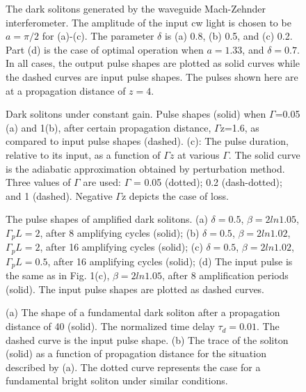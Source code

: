 \begin{figure}
\caption{The dark solitons generated by the waveguide
Mach-Zehnder interferometer.  The amplitude of the input cw
light is chosen to be $ a =  \pi /2 $ for (a)-(c).  The
parameter $ \delta $ is (a) 0.8, (b) 0.5, and (c) 0.2.  Part (d) is the case
of optimal operation when $ a =  1.33 $, and $ \delta  =  0.7 $.  In all
cases, the output pulse shapes are plotted as solid curves while
the dashed curves are input pulse shapes.  The pulses shown here are at a
propagation distance of $ z  =  4 $.}
\end{figure}
\begin{figure}
\caption{
Dark solitons under constant gain.  Pulse shapes (solid) when $\Gamma$=0.05
(a) and 1(b), after certain propagation distance, $\Gamma$z=1.6, as
compared to input pulse shapes (dashed). (c): The pulse duration,
relative to its input,  as a function of $\Gamma z$ at various $\Gamma$.
The solid curve is the adiabatic approximation obtained by perturbation
method. Three values of $\Gamma$ are used: $\Gamma$ = 0.05 (dotted);
0.2 (dash-dotted); and 1 (dashed). Negative $\Gamma$z depicts the
case of loss.}
\end{figure}
\begin{figure}
\caption{
The pulse shapes of amplified dark solitons. (a) $ \delta  =  0.5 $,
$ \beta  =  2 ln 1.05 $, $ \Gamma_p L  =  2 $, after 8 amplifying cycles
(solid); (b) $ \delta  =  0.5 $, $ \beta  =  2 ln 1.02 $, $ \Gamma_p L
=  2 $, after 16 amplifying cycles (solid); (c) $ \delta  =  0.5 $,
$ \beta  =  2 ln 1.02 $, $ \Gamma_p L  =  0.5 $, after 16 amplifying
cycles (solid); (d) The input pulse is the same as in Fig. 1(c),
$ \beta  =  2 ln 1.05 $, after 8 amplification periods (solid).  The
input pulse shapes are plotted as dashed curves.}
\end{figure}
\begin{figure}
\caption{
(a) The shape of a fundamental dark soliton after a propagation distance
of 40 (solid). The normalized time delay $ \tau_d  =  0.01 $.  The
dashed curve is the input pulse shape. (b) The trace of the soliton (solid)
as a function of propagation distance for the situation described by (a).
The dotted curve represents the case for a fundamental bright soliton
under similar conditions.}
\end{figure}


